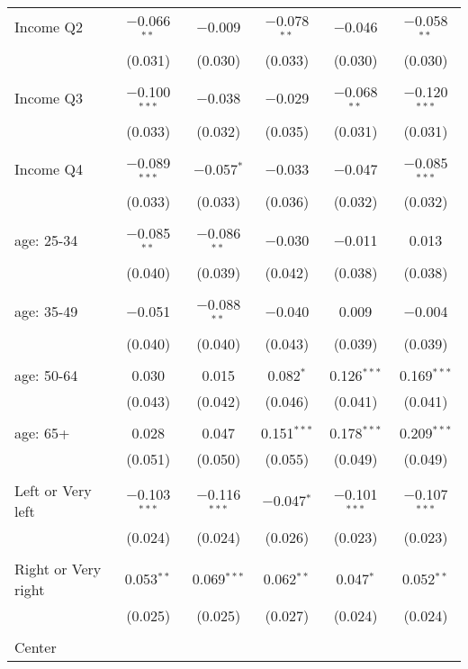 \begin{tabular}{@{\extracolsep{5pt}}lccccc}
 Income Q2 & $-$0.066$^{**}$ & $-$0.009 & $-$0.078$^{**}$ & $-$0.046 & $-$0.058$^{**}$ \\ 
  & (0.031) & (0.030) & (0.033) & (0.030) & (0.030) \\ 
  & & & & & \\ 
 Income Q3 & $-$0.100$^{***}$ & $-$0.038 & $-$0.029 & $-$0.068$^{**}$ & $-$0.120$^{***}$ \\ 
  & (0.033) & (0.032) & (0.035) & (0.031) & (0.031) \\ 
  & & & & & \\ 
 Income Q4 & $-$0.089$^{***}$ & $-$0.057$^{*}$ & $-$0.033 & $-$0.047 & $-$0.085$^{***}$ \\ 
  & (0.033) & (0.033) & (0.036) & (0.032) & (0.032) \\ 
  & & & & & \\ 
 age: 25-34 & $-$0.085$^{**}$ & $-$0.086$^{**}$ & $-$0.030 & $-$0.011 & 0.013 \\ 
  & (0.040) & (0.039) & (0.042) & (0.038) & (0.038) \\ 
  & & & & & \\ 
 age: 35-49 & $-$0.051 & $-$0.088$^{**}$ & $-$0.040 & 0.009 & $-$0.004 \\ 
  & (0.040) & (0.040) & (0.043) & (0.039) & (0.039) \\ 
  & & & & & \\ 
 age: 50-64 & 0.030 & 0.015 & 0.082$^{*}$ & 0.126$^{***}$ & 0.169$^{***}$ \\ 
  & (0.043) & (0.042) & (0.046) & (0.041) & (0.041) \\ 
  & & & & & \\ 
 age: 65+ & 0.028 & 0.047 & 0.151$^{***}$ & 0.178$^{***}$ & 0.209$^{***}$ \\ 
  & (0.051) & (0.050) & (0.055) & (0.049) & (0.049) \\ 
  & & & & & \\ 
 Left or Very left & $-$0.103$^{***}$ & $-$0.116$^{***}$ & $-$0.047$^{*}$ & $-$0.101$^{***}$ & $-$0.107$^{***}$ \\ 
  & (0.024) & (0.024) & (0.026) & (0.023) & (0.023) \\ 
  & & & & & \\ 
 Right or Very right & 0.053$^{**}$ & 0.069$^{***}$ & 0.062$^{**}$ & 0.047$^{*}$ & 0.052$^{**}$ \\ 
  & (0.025) & (0.025) & (0.027) & (0.024) & (0.024) \\ 
  & & & & & \\ 
 Center &  &  &  &  &  \\ 

\end{tabular}
